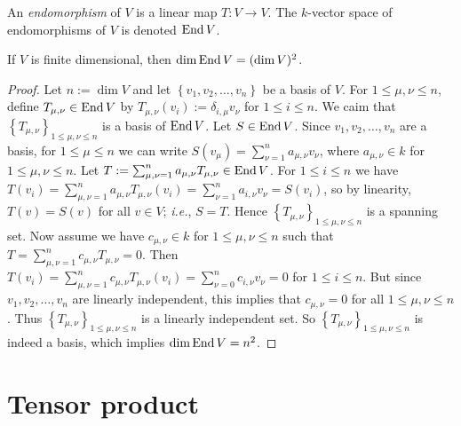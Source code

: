 \begin{dfn}
  An \textit{endomorphism} of $V$ is a linear map $T: V \to V$. The
  $k$-vector space of endomorphisms of $V$ is denoted $\operatorname{End} V$.
\end{dfn}

\begin{lem}
  \label{dimend}
  If $V$ is finite dimensional, then $\dim \End V = (\dim V\sm)^2$.
  \begin{proof}
    Let $n := \dim V$ and let $\left\{v_1,v_2,\ldots,v_n\right\}$ be a
    basis of $V$. For $1 \le \mu,\nu \le n$, define $T_{\mu,\nu}
    \in \operatorname{End} V$ by $T_{\mu,\nu}(v_i) := \delta_{i,\mu}v_\nu$ for $1
    \le i \le n$. We caim that $\left\{T_{\mu,\nu}\right\}_{1 \le
      \mu,\nu \le n}$ is a basis of $\operatorname{End} V$. Let $S \in \operatorname{End}
    V$. Since $v_1,v_2,\ldots,v_n$ are a basis, for $1 \le \mu \le n$
    we can write $S(v_\mu) = \sum_{\nu=1}^n a_{\mu,\nu} v_\nu$, where
    $a_{\mu,\nu} \in k$ for $1 \le \mu,\nu \le n$. Let $T :=
    \sum_{\mu,\nu=1}^n a_{\mu,\nu} T_{\mu,\nu} \in \operatorname{End} V$. For $1 \le
    i \le n$ we have $T(v_i) = \sum_{\mu,\nu=1}^n a_{\mu,\nu}
    T_{\mu,\nu}(v_i) = \sum_{\nu=1}^n a_{i,\nu}v_\nu = S(v_i)$, so by
    linearity, $T(v) = S(v)$ for all $v \in V$; \emph{i.e.}, $S =
    T$. Hence $\left\{T_{\mu,\nu}\right\}_{1\le \mu,\nu \le n}$ is a
    spanning set. Now assume we have $c_{\mu,\nu} \in k$ for $1 \le
    \mu,\nu \le n$ such that $T = \sum_{\mu,\nu=1}^n c_{\mu,\nu}
    T_{\mu,\nu} = 0$. Then $T(v_i) = \sum_{\mu,\nu=1}^n c_{\mu,\nu}
    T_{\mu,\nu}(v_i) = \sum_{\nu=0}^n c_{i,\nu} v_{\nu} = 0$ for $1
    \le i \le n$. But since $v_1,v_2,\ldots,v_n$ are linearly
    independent, this implies that $c_{\mu,\nu} = 0$ for all $1 \le
    \mu, \nu \le n$. Thus $\left\{T_{\mu,\nu}\right\}_{1 \le \mu,\nu
      \le n}$ is a linearly independent set. So
    $\left\{T_{\mu,\nu}\right\}_{1 \le \mu,\nu \le n}$ is indeed a
    basis, which implies $\dim \operatorname{End} V = n^2$.
  \end{proof}
\end{lem}



\section{Tensor product}

